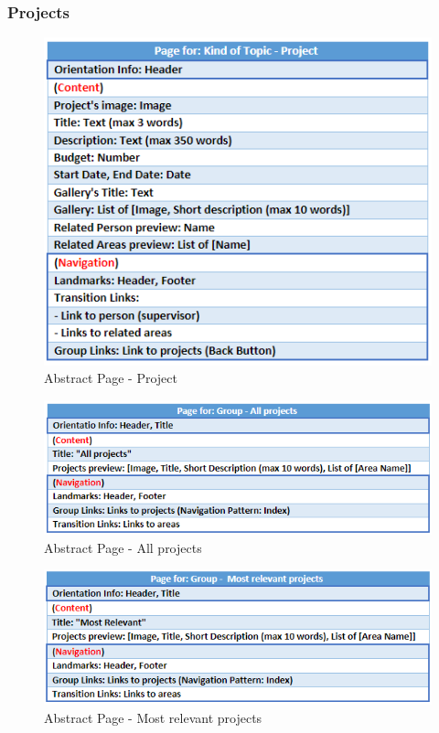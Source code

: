 \documentclass[11pt, letterpaper]{article}
\begin{document}
\subsubsection{Projects}
\begin{figure}[H]
    \centering
    \includegraphics[width=15cm]{images/Abstract Pages/AB - Project.png}
    \caption{Abstract Page - Project}
    \label{fig:AbstractPage_Project}
\end{figure}

\begin{figure}[H]
    \centering
    \includegraphics[width=15cm]{images/Abstract Pages/AB - All projects.png}
    \caption{Abstract Page - All projects}
    \label{fig:AbstractPage_All_persons}
\end{figure}

\begin{figure}[H]
    \centering
    \includegraphics[width=15cm]{images/Abstract Pages/AB - Most relevant projects.png}
    \caption{Abstract Page - Most relevant projects}
    \label{fig:AbstractPage_Most_relevant_projects}
\end{figure}
\end{document}
